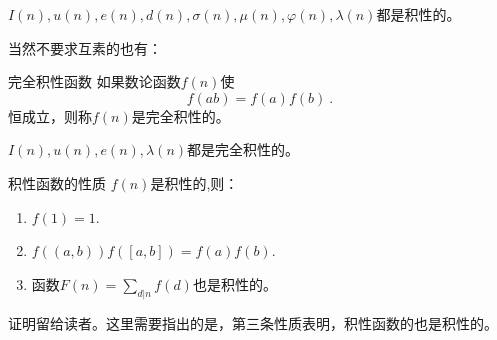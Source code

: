 \begin{example}{}
$I(n),u(n),e(n),d(n),\sigma(n),\mu(n),\varphi(n),\lambda(n)$都是积性的。
\end{example}

当然不要求互素的也有：

\begin{definition}{完全积性函数}
如果数论函数$f(n)$使
\begin{equation}
f(ab)=f(a)f(b)~.
\end{equation}
恒成立，则称$f(n)$是完全积性的。
\end{definition}

\begin{example}{}
$I(n),u(n),e(n),\lambda(n)$都是完全积性的。
\end{example}

\begin{theorem}{积性函数的性质}
$f(n)$是积性的,则：
\begin{enumerate}
\item $f(1)=1$.
\item $f((a,b))f([a,b])=f(a)f(b)$.
\item 函数$F(n)=\sum\limits_{d|n}f(d)$也是积性的。
\end{enumerate}
\end{theorem}

证明留给读者。这里需要指出的是，第三条性质表明，积性函数的也是积性的。
